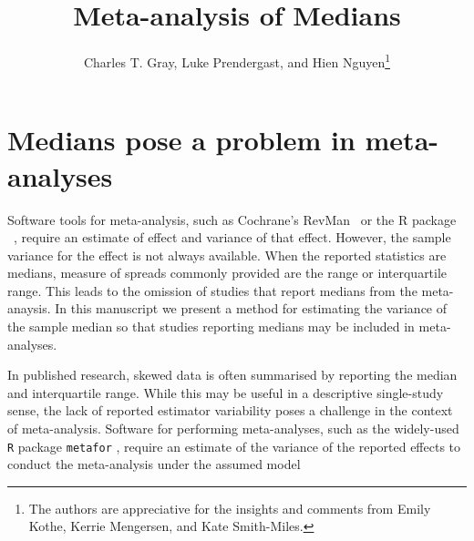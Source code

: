\documentclass{article}
\title{Meta-analysis of Medians}
\author{Charles T. Gray, Luke Prendergast, and Hien Nguyen\thanks{
The authors are appreciative for the insights and comments from Emily Kothe, Kerrie Mengersen, and Kate Smith-Miles.
}}
\begin{document}
\maketitle


\begin{abstract}
\end{abstract}


\section{Medians pose a problem in meta-analyses}

Software tools for meta-analysis, such as Cochrane's
RevMan~
or the R package ~,
require an estimate of effect and variance
of that effect. However, the sample variance for the effect is not always available.
When the reported statistics are medians, measure of spreads commonly provided
are the range or interquartile range. This leads to the omission of studies that report medians from the meta-anaysis. In this manuscript we present a method for estimating the variance of the sample median so that studies reporting medians may be included in meta-analyses.



In published research, skewed data is often summarised by reporting the median and interquartile range. While this may be useful in a descriptive single-study sense, the lack of reported estimator variability poses a challenge in the context of meta-analysis.  Software for performing meta-analyses, such as the widely-used \texttt{R} package \texttt{metafor} \cite{Metafor2010}, require an estimate of the variance of the reported effects to conduct the meta-analysis under the assumed model
\end{document}
